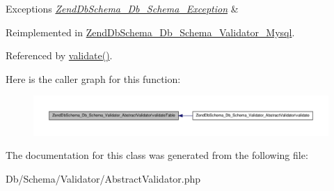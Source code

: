 \begin{DoxyExceptions}{\-Exceptions}
{\em \hyperlink{classZendDbSchema__Db__Schema__Exception}{\-Zend\-Db\-Schema\-\_\-\-Db\-\_\-\-Schema\-\_\-\-Exception}} & \\
\hline
\end{DoxyExceptions}


\-Reimplemented in \hyperlink{classZendDbSchema__Db__Schema__Validator__Mysql_a0c68fa05f88c3a6f603b04709133ef68}{\-Zend\-Db\-Schema\-\_\-\-Db\-\_\-\-Schema\-\_\-\-Validator\-\_\-\-Mysql}.



\-Referenced by \hyperlink{AbstractValidator_8php_source_l00099}{validate()}.



\-Here is the caller graph for this function\-:\nopagebreak
\begin{figure}[H]
\begin{center}
\leavevmode
\includegraphics[width=350pt]{classZendDbSchema__Db__Schema__Validator__AbstractValidator_a097f3953952902e3a2d48e200427ed8b_icgraph}
\end{center}
\end{figure}




\-The documentation for this class was generated from the following file\-:\begin{DoxyCompactItemize}
\item 
\-Db/\-Schema/\-Validator/\-Abstract\-Validator.\-php\end{DoxyCompactItemize}
